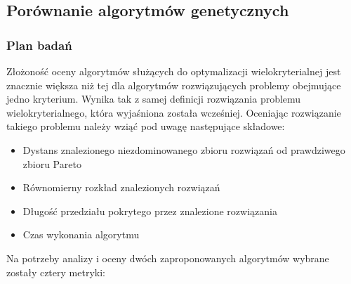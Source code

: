 \documentclass[twoside]{iisthesis}
\begin{document}
\subsection{Porównanie algorytmów genetycznych}
\subsubsection{Plan badań}
Złożoność oceny algorytmów służących do optymalizacji wielokryterialnej jest znacznie większa niż tej dla algorytmów rozwiązujących problemy obejmujące jedno kryterium. Wynika tak z samej definicji rozwiązania problemu wielokryterialnego, która wyjaśniona została wcześniej. Oceniając rozwiązanie takiego problemu należy wziąć pod uwagę następujące składowe:
\begin{itemize}
	\item Dystans znalezionego niezdominowanego zbioru rozwiązań od prawdziwego zbioru Pareto
	\item Równomierny rozkład znalezionych rozwiązań
	\item Długość przedziału pokrytego przez znalezione rozwiązania
	\item Czas wykonania algorytmu\\
\end{itemize}
Na potrzeby analizy i oceny dwóch zaproponowanych algorytmów wybrane zostały cztery metryki:
\end{document}
